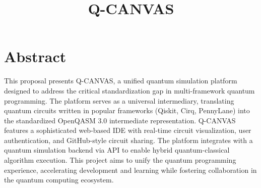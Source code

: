\documentclass{fast-nuces-bs}
\title{Q-CANVAS}
\begin{document}
\renewcommand{\headrulewidth}{0pt}
\setlength{\headsep}{6pt}

\chapter*{Abstract}\thispagestyle{empty}
This proposal presents Q-CANVAS, a unified quantum simulation platform designed to address the critical standardization gap in multi-framework quantum programming. The platform serves as a universal intermediary, translating quantum circuits written in popular frameworks (Qiskit, Cirq, PennyLane) into the standardized OpenQASM 3.0 intermediate representation. Q-CANVAS features a sophisticated web-based IDE with real-time circuit visualization, user authentication, and GitHub-style circuit sharing. The platform integrates with a quantum simulation backend via API to enable hybrid quantum-classical algorithm execution. This project aims to unify the quantum programming experience, accelerating development and learning while fostering collaboration in the quantum computing ecosystem.

\clearpage
\setcounter{page}{1}
\pagestyle{fancy}





%


 
\end{document}
